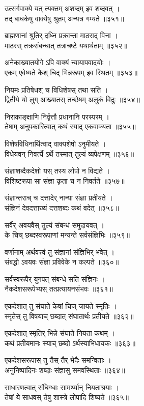 उत्सर्गवाक्ये यत् त्यक्तम् अशब्दम् इव शब्दवत् ।\\तद् बाधकेषु वाक्येषु श्रुतम् अन्यत्र गम्यते ॥३५१॥

ब्राह्मणानां श्रुतिर् दध्नि प्रक्रान्ता माठराद् विना ।\\माठरस् तक्रसंबन्धात् तत्राचष्टे यथार्थताम् ॥३५२॥

अनेकाख्यातयोगे ऽपि वाक्यं न्यायापवादयोः ।\\एकम् एवेष्यते कैश् चिद् भिन्नरूपम् इव स्थितम् ॥३५३॥

नियमः प्रतिषेधश् च विधिशेषस् तथा सति ।\\द्वितीये यो लुग् आख्यातस् तच्छेषम् अलुकं विदुः ॥३५४॥

निराकाङ्क्षाणि निर्वृत्तौ प्रधानानि परस्परम् ।\\तेषाम् अनुपकारित्वात् कथं स्याद् एकवाक्यता ॥३५५॥

विशेषविधिनार्थित्वाद् वाक्यशेषो ऽनुमीयते ।\\विधेयवन् निवर्त्ये ऽर्थे तस्मात् तुल्यं व्यपेक्षणम् ॥३५६॥

संज्ञाशब्दैकदेशो यस् तस्य लोपो न विद्यते ।\\विशिष्टरूपा सा संज्ञा कृता च न निवर्तते ॥३५७॥

संज्ञान्तराच् च दत्तादेर् नान्या संज्ञा प्रतीयते ।\\संज्ञिनं देवदत्ताख्यं दत्तशब्दः कथं वदेत् ॥३५८॥

सर्वैर् अवयवैस् तुल्यं संबन्धं समुदायवत् ।\\के चिच् छब्दस्वरूपाणां मन्यन्ते सर्वसंज्ञिभिः ॥३५९॥

वर्णानाम् अर्थवत्त्वं तु संज्ञानां संज्ञिभिर् भवेत् ।\\संबद्धो ऽवयवः संज्ञा प्रविवेके न कल्पते ॥३६०॥

सर्वस्वरूपैर् युगपत् संबन्धे सति संज्ञिनः ।\\नैकदेशसरूपेभ्यस् तत्प्रत्यायनसंभवः ॥३६१॥

एकदेशात् तु संघाते केषां चिज् जायते स्मृतिः ।\\स्मृतेस् तु विषयाच् छब्दात् संघातार्थः प्रतीयते ॥३६२॥

एकदेशात् स्मृतिर् भिन्ने संघाते नियता कथम् ।\\कथं प्रतीयमानः स्याच् छब्दो ऽर्थस्याभिधायकः ॥३६३॥

एकदेशसरूपास् तु तैस् तैर् भेदैः समन्विताः ।\\अनुनिष्पादिनः शब्दाः संज्ञासु समवस्थिताः ॥३६४॥

साधारणत्वात् संधिग्धाः सामर्थ्यान् नियताश्रयाः ।\\तेषां ये साधवस् तेषु शास्त्रे लोपादि शिष्यते ॥३६५॥

